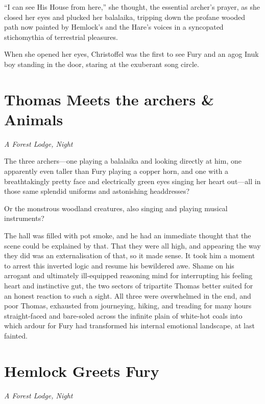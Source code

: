 \documentclass[11pt,a5paper]{article}
\newcommand{\alet}[1]{\textit{#1}\vspace{1em}}
\begin{document}
``I can see His House from here,'' she thought, the essential archer's prayer, as she closed her eyes and plucked her balalaika, tripping down the profane wooded path now painted by Hemlock's and the Hare's voices in a syncopated stichomythia of terrestrial pleasures.

When she opened her eyes, Christoffel was the first to see Fury and an agog Inuk boy standing in the door, staring at the exuberant song circle.

\newpage

\section{Thomas Meets the archers \& Animals}

\alet{A Forest Lodge, Night}


The three archers---one playing a balalaika and looking directly at him, one apparently even taller than Fury playing a copper horn, and one with a breathtakingly pretty face and electrically green eyes singing her heart out---all in those same splendid uniforms and astonishing headdresses?

Or the monstrous woodland creatures, also singing and playing musical instruments?

The hall was filled with pot smoke, and he had an immediate thought that the scene could be explained by that. That they were all high, and appearing the way they did was an externalisation of that, so it made sense. It took him a moment to arrest this inverted logic and resume his bewildered awe. Shame on his arrogant and ultimately ill-equipped reasoning mind for interrupting his feeling heart and instinctive gut, the two sectors of tripartite Thomas better suited for an honest reaction to such a sight. All three were overwhelmed in the end, and poor Thomas, exhausted from journeying, hiking, and treading for many hours straight-faced and bare-soled across the infinite plain of white-hot coals into which ardour for Fury had transformed his internal emotional landscape, at last fainted.

\newpage

\section{Hemlock Greets Fury}

\alet{A Forest Lodge, Night}

\end{document}
